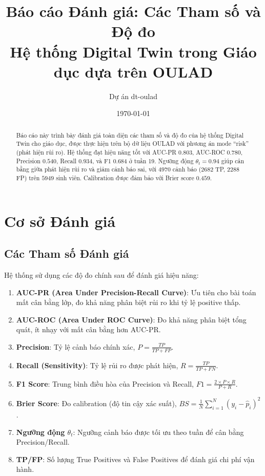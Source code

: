 \documentclass[12pt,a4paper]{article}
\begin{document}
\title{Báo cáo Đánh giá: Các Tham số và Độ đo\\ 
Hệ thống Digital Twin trong Giáo dục dựa trên OULAD}
\author{Dự án dt-oulad}
\date{\today}
\maketitle

\begin{abstract}
Báo cáo này trình bày đánh giá toàn diện các tham số và độ đo của hệ thống Digital Twin cho giáo dục, được thực hiện trên bộ dữ liệu OULAD với phương án mode ``risk'' (phát hiện rủi ro). Hệ thống đạt hiệu năng tốt với AUC-PR $0.803$, AUC-ROC $0.780$, Precision $0.540$, Recall $0.934$, và F1 $0.684$ ở tuần 19. Ngưỡng động $\theta_t = 0.94$ giúp cân bằng giữa phát hiện rủi ro và giảm cảnh báo sai, với $4970$ cảnh báo ($2682$ TP, $2288$ FP) trên $5949$ sinh viên. Calibration được đảm bảo với Brier score $0.459$.
\end{abstract}

\section{Cơ sở Đánh giá}

\subsection{Các Tham số Đánh giá}

Hệ thống sử dụng các độ đo chính sau để đánh giá hiệu năng:

\begin{enumerate}
    \item \textbf{AUC-PR (Area Under Precision-Recall Curve)}: Ưu tiên cho bài toán mất cân bằng lớp, đo khả năng phân biệt rủi ro khi tỷ lệ positive thấp.
    \item \textbf{AUC-ROC (Area Under ROC Curve)}: Đo khả năng phân biệt tổng quát, ít nhạy với mất cân bằng hơn AUC-PR.
    \item \textbf{Precision}: Tỷ lệ cảnh báo chính xác, $P = \frac{TP}{TP + FP}$.
    \item \textbf{Recall (Sensitivity)}: Tỷ lệ rủi ro được phát hiện, $R = \frac{TP}{TP + FN}$.
    \item \textbf{F1 Score}: Trung bình điều hòa của Precision và Recall, $F1 = \frac{2 \times P \times R}{P + R}$.
    \item \textbf{Brier Score}: Đo calibration (độ tin cậy xác suất), $BS = \frac{1}{N}\sum_{i=1}^{N}(y_i - \hat{p}_i)^2$.
    \item \textbf{Ngưỡng động $\theta_t$}: Ngưỡng cảnh báo được tối ưu theo tuần để cân bằng Precision/Recall.
    \item \textbf{TP/FP}: Số lượng True Positives và False Positives để đánh giá chi phí vận hành.
\end{enumerate}
\end{document}
